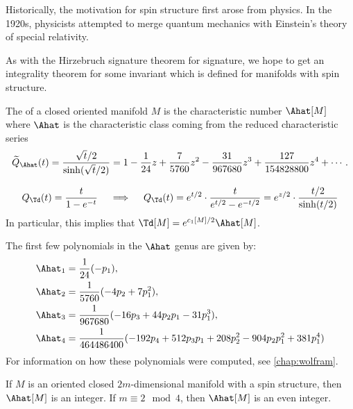 \begin{remark}
	Historically, the motivation for spin structure first arose from physics. In the 1920s, physicists attempted to merge quantum mechanics with Einstein's theory of special relativity. 
\end{remark}

As with the Hirzebruch signature theorem for signature, we hope to get an integrality theorem for some invariant which is defined for manifolds with spin structure. 

\begin{definition}
	The  of a closed oriented manifold $M$ is the characteristic number $\Ahat[M]$ where $\Ahat$ is the characteristic class coming from the reduced characteristic series
	\[
		\widetilde{Q}_{\Ahat}(t) = \frac{\sqrt{t}/2}{\sinh(\sqrt{t}/2)} = 1 - \frac{1}{24} z + \frac{7}{5760} z^2 - \frac{31}{967680} z^3 + \frac{127}{154828800}z^4+\cdots.
	\]
\end{definition}

\begin{remark}
\[
	Q_{\Td}(t) = \frac{t}{1-e^{-t}}\quad\implies\quad Q_{\Td}(t) = e^{t/2}\cdot \frac{t}{e^{t/2}-e^{-t/2}} = e^{z/2}\cdot \frac{t/2}{\sinh(t/2)}
\]
	In particular, this implies that $\Td[M]=e^{c_1[M]/2}\Ahat[M]$.
\end{remark}

\begin{example}
	The first few polynomials in the $\Ahat$ genus are given by:
\[
	\begin{aligned}
		\Ahat_1 &= \frac{1}{24}(-p_1),\\
		\Ahat_2 &= \frac{1}{5760}(-4p_2 + 7p_1^2),\\
		\Ahat_3 &= \frac{1}{967680}(-16p_3+44p_2p_1-31p_1^3),\\
		\Ahat_4 &= \frac{1}{464486400}(-192p_4+512p_3p_1+208p_2^2-904p_2p_1^2+381p_1^4)
	\end{aligned}
\]
	For information on how these polynomials were computed, see \cref{chap:wolfram}.
\end{example}


\begin{theorem}\label{thm:Ahat-integrality}
	If $M$ is an oriented closed $2m$-dimensional manifold with a spin structure, then $\Ahat[M]$ is an integer. If $m\equiv 2\mod 4$, then $\Ahat[M]$ is an even integer.
\end{theorem}

